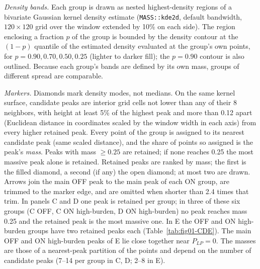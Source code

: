 \documentclass[11pt]{article}
\begin{document}
\emph{Density bands.} Each group is drawn as nested highest-density regions of a
bivariate Gaussian kernel density estimate (\texttt{MASS::kde2d}, default
bandwidth, $120\times120$ grid over the window extended by 10\% on each side). The
region enclosing a fraction $p$ of the group is bounded by the density contour at
the $(1-p)$ quantile of the estimated density evaluated at the group's own points,
for $p = 0.90, 0.70, 0.50, 0.25$ (lighter to darker fill); the $p = 0.90$ contour is
also outlined. Because each group's bands are defined by its own mass, groups of
different spread are comparable.

\emph{Markers.} Diamonds mark density modes, not medians. On the same kernel surface,
candidate peaks are interior grid cells not lower than any of their 8 neighbors, with height
at least 5\% of the highest peak and more than 0.12 apart (Euclidean distance in
coordinates scaled by the window width in each axis) from every higher retained
peak. Every point of the group is assigned to its nearest candidate peak (same scaled
distance), and the share of points so assigned is the peak's \emph{mass}. Peaks with
mass $\ge 0.25$ are retained; if none reaches 0.25 the most massive peak alone is
retained. Retained peaks are ranked by mass; the first is the filled diamond, a
second (if any) the open diamond; at most two are drawn. Arrows join the main OFF
peak to the main peak of each ON group, are trimmed to the marker edge, and are
omitted when shorter than 2.4 times that trim. In panels C and D one peak is retained
per group; in three of these six groups (C OFF, C ON high-burden, D ON high-burden)
no peak reaches mass 0.25 and the retained peak is the most massive one. In E the OFF
and ON high-burden groups have two retained peaks each (Table~\ref{tab:fig01-CDE}).
The main OFF and ON high-burden peaks of E lie close together near $P_{LP} = 0$. The masses are those of a nearest-peak partition of the
points and depend on the number of candidate peaks (7--14 per group in C, D; 2--8 in E).
\end{document}
